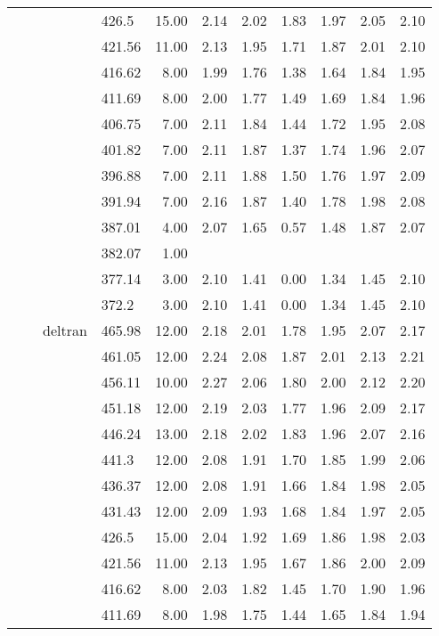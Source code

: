 \begin{longtable}{llllrrrrrrr}
   &  &  & 426.5 & 15.00 & 2.14 & 2.02 & 1.83 & 1.97 & 2.05 & 2.10 \\ 
   &  &  & 421.56 & 11.00 & 2.13 & 1.95 & 1.71 & 1.87 & 2.01 & 2.10 \\ 
   &  &  & 416.62 & 8.00 & 1.99 & 1.76 & 1.38 & 1.64 & 1.84 & 1.95 \\ 
   &  &  & 411.69 & 8.00 & 2.00 & 1.77 & 1.49 & 1.69 & 1.84 & 1.96 \\ 
   &  &  & 406.75 & 7.00 & 2.11 & 1.84 & 1.44 & 1.72 & 1.95 & 2.08 \\ 
   &  &  & 401.82 & 7.00 & 2.11 & 1.87 & 1.37 & 1.74 & 1.96 & 2.07 \\ 
   &  &  & 396.88 & 7.00 & 2.11 & 1.88 & 1.50 & 1.76 & 1.97 & 2.09 \\ 
   &  &  & 391.94 & 7.00 & 2.16 & 1.87 & 1.40 & 1.78 & 1.98 & 2.08 \\ 
   &  &  & 387.01 & 4.00 & 2.07 & 1.65 & 0.57 & 1.48 & 1.87 & 2.07 \\ 
   &  &  & 382.07 & 1.00 &  &  &  &  &  &  \\ 
   &  &  & 377.14 & 3.00 & 2.10 & 1.41 & 0.00 & 1.34 & 1.45 & 2.10 \\ 
   &  &  & 372.2 & 3.00 & 2.10 & 1.41 & 0.00 & 1.34 & 1.45 & 2.10 \\ 
   &  & deltran & 465.98 & 12.00 & 2.18 & 2.01 & 1.78 & 1.95 & 2.07 & 2.17 \\ 
   &  &  & 461.05 & 12.00 & 2.24 & 2.08 & 1.87 & 2.01 & 2.13 & 2.21 \\ 
   &  &  & 456.11 & 10.00 & 2.27 & 2.06 & 1.80 & 2.00 & 2.12 & 2.20 \\ 
   &  &  & 451.18 & 12.00 & 2.19 & 2.03 & 1.77 & 1.96 & 2.09 & 2.17 \\ 
   &  &  & 446.24 & 13.00 & 2.18 & 2.02 & 1.83 & 1.96 & 2.07 & 2.16 \\ 
   &  &  & 441.3 & 12.00 & 2.08 & 1.91 & 1.70 & 1.85 & 1.99 & 2.06 \\ 
   &  &  & 436.37 & 12.00 & 2.08 & 1.91 & 1.66 & 1.84 & 1.98 & 2.05 \\ 
   &  &  & 431.43 & 12.00 & 2.09 & 1.93 & 1.68 & 1.84 & 1.97 & 2.05 \\ 
   &  &  & 426.5 & 15.00 & 2.04 & 1.92 & 1.69 & 1.86 & 1.98 & 2.03 \\ 
   &  &  & 421.56 & 11.00 & 2.13 & 1.95 & 1.67 & 1.86 & 2.00 & 2.09 \\ 
   &  &  & 416.62 & 8.00 & 2.03 & 1.82 & 1.45 & 1.70 & 1.90 & 1.96 \\ 
   &  &  & 411.69 & 8.00 & 1.98 & 1.75 & 1.44 & 1.65 & 1.84 & 1.94 \\ 

\end{longtable}
